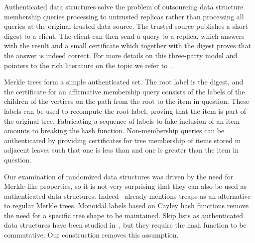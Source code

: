 Authenticated data structures solve the problem of outsourcing data structure membership queries processing to untrusted replicas rather than processing all queries at the original trusted data source. The trusted source publishes a short digest to a client. The client can then send a query to a replica, which answers with the result and a small certificate which together with the digest proves that the answer is indeed correct. For more details on this three-party model and pointers to the rich literature on the topic we refer to~\cite{martel2004general}.

Merkle trees form a simple authenticated set. The root label is the digest, and the certificate for an affirmative membership query consists of the labels of the children of the vertices on the path from the root to the item in question. These labels can be used to recompute the root label, proving that the item is part of the original tree. Fabricating a sequence of labels to fake inclusion of an item amounts to breaking the hash function. Non-membership queries can be authenticated by providing certificates for tree membership of items stored in adjacent leaves such that one is less than and one is greater than the item in question.

Our examination of randomized data structures was driven by the need for Merkle-like properties, so it is not very surprising that they can also be used as authenticated data structures. Indeed~\cite{naor2000certificate} already mentions treaps as an alternative to regular Merkle trees. Monoidal labels based on Cayley hash functions remove the need for a specific tree shape to be maintained. Skip lists as authenticated data structures have been studied in~\cite{goodrich2000efficient}, but they require the hash function to be commutative. Our construction removes this assumption.
